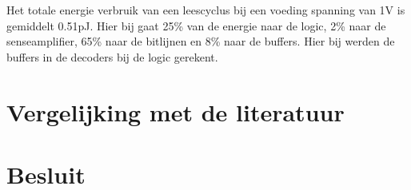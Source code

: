 Het totale energie verbruik van een leescyclus bij een voeding spanning van 1V is gemiddelt 0.51pJ. Hier bij gaat 25\% van de energie naar de logic, 2\% naar de senseamplifier, 65\% naar de bitlijnen en 8\% naar de buffers. Hier bij werden de buffers in de decoders bij de logic gerekent.

\section{Vergelijking met de literatuur}

\section{Besluit}
